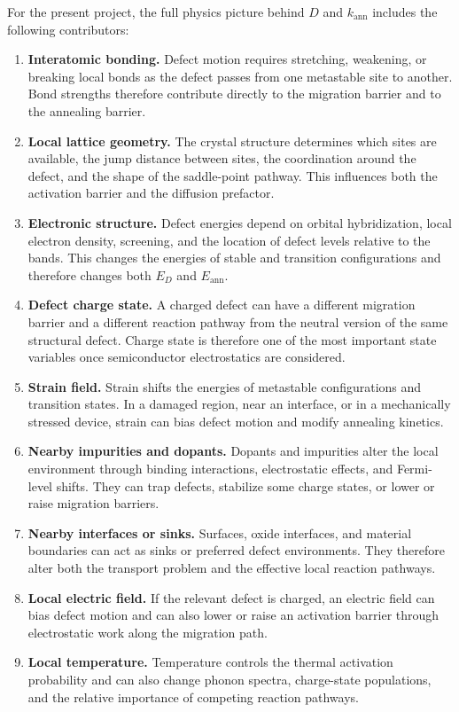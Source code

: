 \documentclass[11pt]{article}
\begin{document}
For the present project, the full physics picture behind $D$ and $k_{\mathrm{ann}}$ includes the following contributors:
\begin{enumerate}[label=\arabic*.]
    \item \textbf{Interatomic bonding.} Defect motion requires stretching, weakening, or breaking local bonds as the defect passes from one metastable site to another. Bond strengths therefore contribute directly to the migration barrier and to the annealing barrier.
    \item \textbf{Local lattice geometry.} The crystal structure determines which sites are available, the jump distance between sites, the coordination around the defect, and the shape of the saddle-point pathway. This influences both the activation barrier and the diffusion prefactor.
    \item \textbf{Electronic structure.} Defect energies depend on orbital hybridization, local electron density, screening, and the location of defect levels relative to the bands. This changes the energies of stable and transition configurations and therefore changes both $E_D$ and $E_{\mathrm{ann}}$.
    \item \textbf{Defect charge state.} A charged defect can have a different migration barrier and a different reaction pathway from the neutral version of the same structural defect. Charge state is therefore one of the most important state variables once semiconductor electrostatics are considered.
    \item \textbf{Strain field.} Strain shifts the energies of metastable configurations and transition states. In a damaged region, near an interface, or in a mechanically stressed device, strain can bias defect motion and modify annealing kinetics.
    \item \textbf{Nearby impurities and dopants.} Dopants and impurities alter the local environment through binding interactions, electrostatic effects, and Fermi-level shifts. They can trap defects, stabilize some charge states, or lower or raise migration barriers.
    \item \textbf{Nearby interfaces or sinks.} Surfaces, oxide interfaces, and material boundaries can act as sinks or preferred defect environments. They therefore alter both the transport problem and the effective local reaction pathways.
    \item \textbf{Local electric field.} If the relevant defect is charged, an electric field can bias defect motion and can also lower or raise an activation barrier through electrostatic work along the migration path.
    \item \textbf{Local temperature.} Temperature controls the thermal activation probability and can also change phonon spectra, charge-state populations, and the relative importance of competing reaction pathways.
\end{enumerate}
\end{document}
